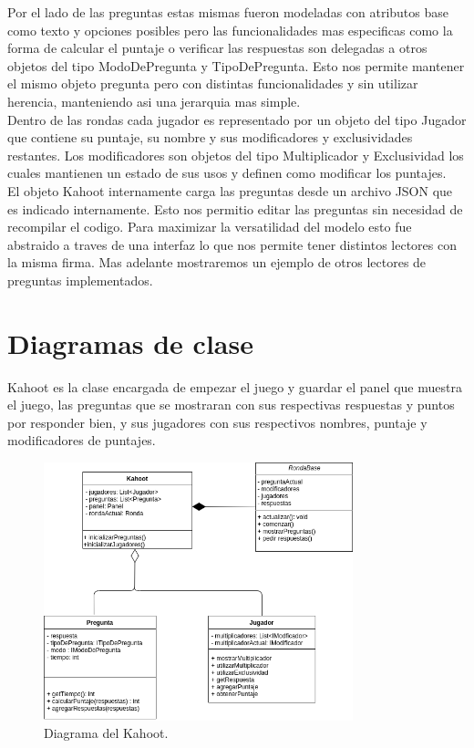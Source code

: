 \documentclass[titlepage,a4paper]{article}
\begin{document}
Por el lado de las preguntas estas mismas fueron modeladas con atributos base como texto y opciones posibles pero las funcionalidades mas especificas como la forma de calcular el puntaje o verificar las respuestas son delegadas a otros objetos del tipo ModoDePregunta y TipoDePregunta. Esto nos permite mantener el mismo objeto pregunta pero con distintas funcionalidades y sin utilizar herencia, manteniendo asi una jerarquia mas simple.\\

Dentro de las rondas cada jugador es representado por un objeto del tipo Jugador que contiene su puntaje, su nombre y sus modificadores y exclusividades restantes. Los modificadores son objetos del tipo Multiplicador y Exclusividad los cuales mantienen un estado de sus usos y definen como modificar los puntajes.\\

El objeto Kahoot internamente carga las preguntas desde un archivo JSON que es indicado internamente. Esto nos permitio editar las preguntas sin necesidad de recompilar el codigo. Para maximizar la versatilidad del modelo esto fue abstraido a traves de una interfaz lo que nos permite tener distintos lectores con la misma firma. Mas adelante mostraremos un ejemplo de otros lectores de preguntas implementados.\\


\section{Diagramas de clase}\label{sec:diagramasdeclase}

Kahoot es la clase encargada de empezar el juego y guardar el panel que muestra el juego, las preguntas que se mostraran con sus respectivas respuestas y puntos por responder bien, y sus jugadores con sus respectivos nombres, puntaje y modificadores de puntajes.

\begin{figure}[H]
\centering
\includegraphics[width=0.8\textwidth]{diagramaGeneral.png}
\caption{\label{fig:class01}Diagrama del Kahoot.}
\end{figure}
\end{document}
